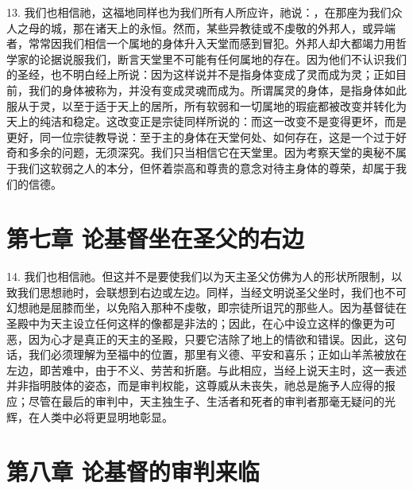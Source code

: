 13. 我们也相信祂，这福地同样也为我们所有人所应许，祂说：，在那座为我们众人之母的城，那在诸天上的永恒。然而，某些异教徒或不虔敬的外邦人，或异端者，常常因我们相信一个属地的身体升入天堂而感到冒犯。外邦人却大都竭力用哲学家的论据说服我们，断言天堂里不可能有任何属地的存在。因为他们不认识我们的圣经，也不明白经上所说：因为这样说并不是指身体变成了灵而成为灵；正如目前，我们的身体被称为，并没有变成灵魂而成为。所谓属灵的身体，是指身体如此服从于灵，以至于适于天上的居所，所有软弱和一切属地的瑕疵都被改变并转化为天上的纯洁和稳定。这改变正是宗徒同样所说的：而这一改变不是变得更坏，而是更好，同一位宗徒教导说：至于主的身体在天堂何处、如何存在，这是一个过于好奇和多余的问题，无须深究。我们只当相信它在天堂里。因为考察天堂的奥秘不属于我们这软弱之人的本分，但怀着崇高和尊贵的意念对待主身体的尊荣，却属于我们的信德。\par


\section{第七章 论基督坐在圣父的右边}

14. 我们也相信祂。但这并不是要使我们以为天主圣父仿佛为人的形状所限制，以致我们思想祂时，会联想到右边或左边。同样，当经文明说圣父坐时，我们也不可幻想祂是屈膝而坐，以免陷入那种不虔敬，即宗徒所诅咒的那些人。因为基督徒在圣殿中为天主设立任何这样的像都是非法的；因此，在心中设立这样的像更为可恶，因为心才是真正的天主的圣殿，只要它洁除了地上的情欲和错误。因此，这句话，我们必须理解为至福中的位置，那里有义德、平安和喜乐；正如山羊羔被放在左边，即苦难中，由于不义、劳苦和折磨。与此相应，当经上说天主时，这一表述并非指明肢体的姿态，而是审判权能，这尊威从未丧失，祂总是施予人应得的报应；尽管在最后的审判中，天主独生子、生活者和死者的审判者那毫无疑问的光辉，在人类中必将更显明地彰显。\par


\section{第八章 论基督的审判来临}

